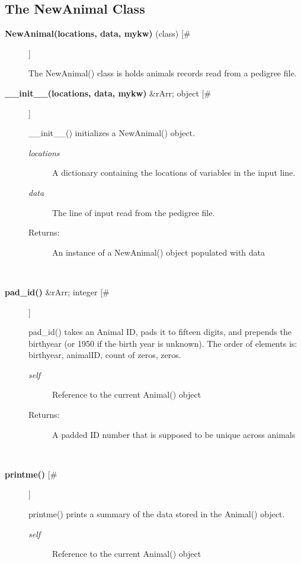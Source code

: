 \subsection*{The NewAnimal Class}
\begin{description}
\item[\textbf{NewAnimal(locations, data, mykw)}
 (class) [\#]]

 The NewAnimal() class is holds animals records read from a pedigree file.

\item[\textbf{\_\_init\_\_(locations, data, mykw)}
 \&rArr; object [\#]]

 \_\_init\_\_() initializes a NewAnimal() object.
\begin{description}
\item[\emph{locations}
] A dictionary containing the locations of variables in the input line.
\item[\emph{data}
] The line of input read from the pedigree file.
\item[Returns:] An instance of a NewAnimal() object populated with data

\end{description}
\\ 

\item[\textbf{pad\_id()}
 \&rArr; integer [\#]]

 pad\_id() takes an Animal ID, pads it to fifteen digits, and prepends the birthyear (or 1950 if the birth year is unknown). The order of elements is: birthyear, animalID, count of zeros, zeros.
\begin{description}
\item[\emph{self}
] Reference to the current Animal() object
\item[Returns:] A padded ID number that is supposed to be unique across animals

\end{description}
\\ 

\item[\textbf{printme()}
 [\#]]

 printme() prints a summary of the data stored in the Animal() object.
\begin{description}
\item[\emph{self}
] Reference to the current Animal() object

\end{description}
\\ 


\end{description}
